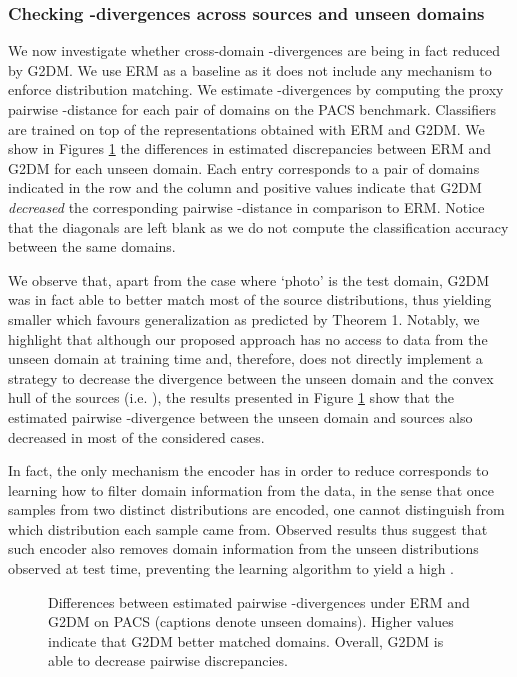 \documentclass{article}
\begin{document}
\vspace{0.3cm}
\subsubsection{Checking -divergences across sources and unseen domains}\label{exp:h_div}
We now investigate whether cross-domain -divergences are being in fact reduced by G2DM. We use ERM as a baseline as it does not include any mechanism to enforce distribution matching. We estimate -divergences by computing the proxy pairwise -distance \cite{ben2007analysis} for each pair of domains on the PACS benchmark. Classifiers are trained on top of the representations  obtained with ERM and G2DM. We show in Figures \ref{fig:a_dist} the differences in estimated discrepancies between ERM and G2DM for each unseen domain. Each entry corresponds to a pair of domains indicated in the row and the column and positive values indicate that G2DM \emph{decreased} the corresponding pairwise -distance in comparison to ERM. Notice that the diagonals are left blank as we do not compute the classification accuracy between the same domains. 

We observe that, apart from the case where `photo' is the test domain, G2DM was in fact able to better match most of the source distributions, thus yielding smaller  which favours generalization as predicted by Theorem 1. Notably, we highlight that although our proposed approach has no access to data from the unseen domain at training time and, therefore, does not directly implement a strategy to decrease the divergence between the unseen domain and the convex hull of the sources (i.e. ), the results presented in Figure \ref{fig:a_dist} show that the estimated pairwise -divergence between the unseen domain and sources also decreased in most of the considered cases. 

In fact, the only mechanism the encoder has in order to reduce  corresponds to learning how to filter domain information from the data, in the sense that once samples from two distinct distributions are encoded, one cannot distinguish from which distribution each sample came from. Observed results thus suggest that such encoder also removes domain information from the unseen distributions observed at test time, preventing the learning algorithm to yield a high .

\begin{figure}[h]
	\centering
	\;
    \;
	\;
	\caption{Differences between estimated pairwise -divergences under ERM and G2DM on PACS (captions denote unseen domains). Higher values indicate that G2DM better matched domains. Overall, G2DM is able to decrease pairwise discrepancies.}
	\label{fig:a_dist}
 \end{figure}
\end{document}
